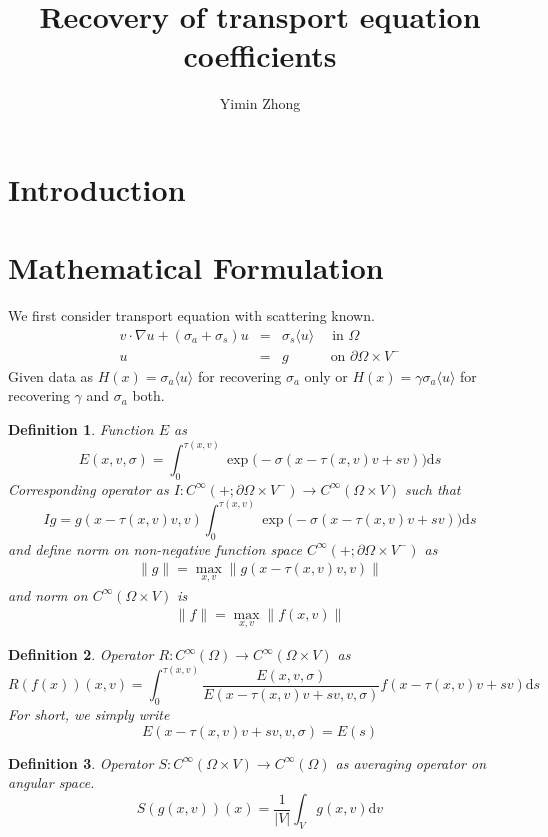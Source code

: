 \documentclass[12pt,a4paper]{article}
\author{Yimin Zhong}
\title{Recovery of transport equation coefficients}
\newcommand{\avg}[1]{\langle#1\rangle}
\newtheorem{Def}{Definition}
\begin{document}
\maketitle
\tableofcontents{}
\section{Introduction}
\section{Mathematical Formulation}
We first consider transport equation with scattering known.
\begin{eqnarray}\label{eq:1}
v\cdot \nabla u + (\sigma_a  +\sigma_s) u &=& \sigma_s \langle u \rangle\quad\; \mbox{in } \Omega \\
u  &=& g \qquad\quad \mbox{on } \partial\Omega\times V^{-}  
\end{eqnarray}
Given data as $H(x) = \sigma_a \langle u \rangle$ for recovering $\sigma_a$ only or $H(x) = \gamma\sigma_a\avg{u}$ for recovering $\gamma$ and $\sigma_a$ both.
\begin{Def}
Function $E$ as $$E(x,v,\sigma) = \int_{0}^{\tau(x,v)} \exp\Big(-\sigma(x- \tau(x,v)v + sv)\Big)\mathrm{d}s$$ 
Corresponding operator as $I:C^{\infty}(+;\partial\Omega\times V^{-})\to C^{\infty}(\Omega\times V)$ such that
$$Ig =  g(x-\tau(x,v)v,v)\int_{0}^{\tau(x,v)} \exp\Big(-\sigma(x- \tau(x,v)v + sv)\Big)\mathrm{d}s $$
and define norm on non-negative function  space $C^{\infty}(+;\partial\Omega\times V^{-})$ as 
\begin{eqnarray}
\|g\| = \max_{x,v} \|g(x-\tau(x,v)v,v)\|
\end{eqnarray}
and norm on $C^{\infty}(\Omega\times V)$ is
\begin{eqnarray}
\|f\| = \max_{x,v}\|f(x,v)\|
\end{eqnarray}
\end{Def}\label{def:1}
\begin{Def}
Operator $R:C^{\infty}(\Omega)\to C^{\infty}(\Omega\times V)$ as 
$$R(f(x))(x,v)  = \int_{0}^{\tau(x,v)} \dfrac{E(x,v,\sigma)}{E(x-\tau(x,v)v +sv,v,\sigma)} f(x-\tau(x,v)v + sv)\mathrm{d}s$$
For short, we simply write
\begin{equation}
E(x - \tau(x,v)v + sv,v,\sigma) = E(s)
\end{equation}
\end{Def}\label{def:2}
\begin{Def}
Operator $S:C^{\infty}(\Omega\times V)\to C^{\infty}(\Omega)$ as averaging operator on angular space.
$$S(g(x,v))(x)  = \dfrac{1}{|V|}\int_{V} g(x,v)\mathrm{d}v$$

\end{Def}\label{def:3}
\end{document}
